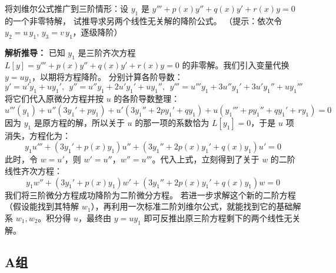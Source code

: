 \documentclass[lang=cn,11pt]{elegantbook}
\begin{document}
\begin{exercise}[刘维尔公式的推广]
将刘维尔公式推广到三阶情形：设 $y_1$ 是
$y'''+p(x)y''+q(x)y'+r(x)y=0$ 的一个非零特解，
试推导求另两个线性无关解的降阶公式。
（提示：依次令 $y_2=u\,y_1$, $y_3=v\,y_1$，逐级降阶）
\end{exercise}
\begin{solution}
\textbf{解析推导：}
已知 $y_1$ 是三阶齐次方程 $L[y] = y''' + p(x)y'' + q(x)y' + r(x)y = 0$ 的非零解。我们引入变量代换 $y = u y_1$，以期将方程降阶。
分别计算各阶导数：
\[
y' = u'y_1 + u y_1',~~y'' = u''y_1 + 2u'y_1' + u y_1'',~~y''' = u'''y_1 + 3u''y_1' + 3u'y_1'' + u y_1'''
\]
将它们代入原微分方程并按 $u$ 的各阶导数整理：
\[
u'''(y_1) + u''(3y_1' + py_1) + u'(3y_1'' + 2py_1' + qy_1) + u(y_1''' + py_1'' + qy_1' + ry_1) = 0
\]
因为 $y_1$ 是原方程的解，所以关于 $u$ 的那一项的系数恰为 $L[y_1] = 0$，于是 $u$ 项消失，方程化为：
\[
y_1 u''' + (3y_1' + p(x)y_1) u'' + (3y_1'' + 2p(x)y_1' + q(x)y_1) u' = 0
\]
此时，令 $w = u'$，则 $w' = u''$，$w'' = u'''$。代入上式，立刻得到了关于 $w$ 的二阶线性齐次方程：
\[
y_1 w'' + (3y_1' + p(x)y_1) w' + (3y_1'' + 2p(x)y_1' + q(x)y_1) w = 0
\]
我们将三阶微分方程成功降阶为二阶微分方程。
若进一步求解这个新的二阶方程（假设能找到其特解 $w_1$），再利用一次标准二阶刘维尔公式，就能找到它的基础解系 $w_1, w_2$。积分得 $u$，最终由 $y = u y_1$ 即可反推出原三阶方程剩下的两个线性无关解。
\end{solution}


\subsection{A组}
\end{document}
